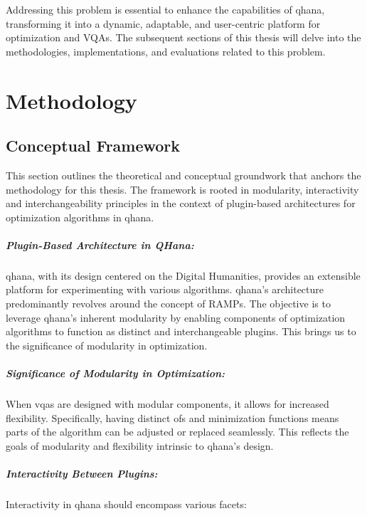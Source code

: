 \documentclass[
  a4paper,  %
  twoside,  %
  bibliography=totoc,
  headsepline,
  cleardoublepage=empty,
  parskip=half,
  draft=false
]{scrbook}
\begin{document}
Addressing this problem is essential to enhance the capabilities of \gls{qhana}, transforming it into a dynamic, adaptable, and user-centric platform for optimization and VQAs.
The subsequent sections of this thesis will delve into the methodologies, implementations, and evaluations related to this problem.



\chapter{Methodology}
\label{chap:methodology}
\section{Conceptual Framework}
\label{sec:conceptualFramework}

This section outlines the theoretical and conceptual groundwork that anchors the methodology for this thesis.
The framework is rooted in modularity, interactivity and interchangeability principles in the context of plugin-based architectures for optimization algorithms in \gls{qhana}.

\paragraph{Plugin-Based Architecture in QHana:}
\gls{qhana}, with its design centered on the Digital Humanities, provides an extensible platform for experimenting with various algorithms.
\gls{qhana}'s architecture predominantly revolves around the concept of RAMPs.
The objective is to leverage \gls{qhana}'s inherent modularity by enabling components of optimization algorithms to function as distinct and interchangeable plugins.
This brings us to the significance of modularity in optimization.

\paragraph{Significance of Modularity in Optimization:}
When \glspl{vqa} are designed with modular components, it allows for increased flexibility.
Specifically, having distinct \glspl{of} and minimization functions means parts of the algorithm can be adjusted or replaced seamlessly.
This reflects the goals of modularity and flexibility intrinsic to \gls{qhana}'s design.

\paragraph{Interactivity Between Plugins:}
Interactivity in \gls{qhana} should encompass various facets:
\end{document}
